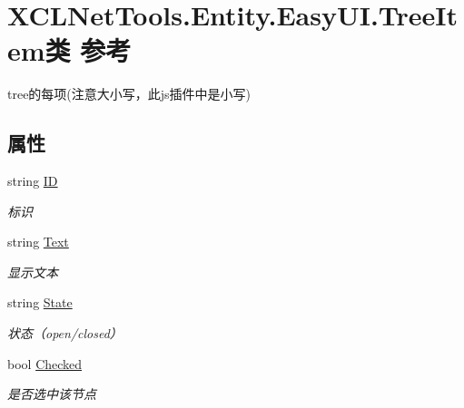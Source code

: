 \hypertarget{class_x_c_l_net_tools_1_1_entity_1_1_easy_u_i_1_1_tree_item}{\section{X\-C\-L\-Net\-Tools.\-Entity.\-Easy\-U\-I.\-Tree\-Item类 参考}
\label{class_x_c_l_net_tools_1_1_entity_1_1_easy_u_i_1_1_tree_item}
}


tree的每项(注意大小写，此js插件中是小写)  


\subsection*{属性}
\begin{DoxyCompactItemize}
\item 
string \hyperlink{class_x_c_l_net_tools_1_1_entity_1_1_easy_u_i_1_1_tree_item_a93f2c5a6d4b3e1af4bd5c3e3fd4192f6}{I\-D}
\begin{DoxyCompactList}\small\item\em 标识 \end{DoxyCompactList}\item 
string \hyperlink{class_x_c_l_net_tools_1_1_entity_1_1_easy_u_i_1_1_tree_item_ad85e722c4909d6b93ea2e80e7014ed0c}{Text}
\begin{DoxyCompactList}\small\item\em 显示文本 \end{DoxyCompactList}\item 
string \hyperlink{class_x_c_l_net_tools_1_1_entity_1_1_easy_u_i_1_1_tree_item_a79ad03a5903f54fdd4d60a3206105def}{State}
\begin{DoxyCompactList}\small\item\em 状态（open/closed） \end{DoxyCompactList}\item 
bool \hyperlink{class_x_c_l_net_tools_1_1_entity_1_1_easy_u_i_1_1_tree_item_a2d4233734dd33a74b5339392b38d5ed0}{Checked}
\begin{DoxyCompactList}\small\item\em 是否选中该节点 \end{DoxyCompactList}\item 

\end{DoxyCompactItemize}

